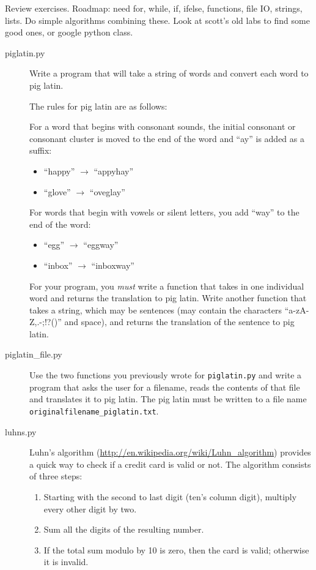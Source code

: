 \documentclass[11pt]{cselabheader}
\begin{document}
Review exercises. Roadmap: need for, while, if, ifelse,
functions, file IO, strings, lists. Do simple algorithms combining these.
Look at scott's old labs to find some good ones, or google python class.

\begin{description}
  \item[piglatin.py] Write a program that will take a string of words and
    convert each word to pig latin. 

    The rules for pig latin are as follows:

    For a word that begins with consonant sounds, the initial consonant or
    consonant cluster is moved to the end of the word and ``ay'' is added as a
    suffix:
    \begin{itemize}
      \item ``happy'' $\to$ ``appyhay''
      \item ``glove'' $\to$ ``oveglay''
    \end{itemize}

    For words that begin with vowels or silent letters, you add ``way'' to the
    end of the word:
    \begin{itemize}
      \item ``egg'' $\to$ ``eggway''
      \item ``inbox'' $\to$ ``inboxway''
    \end{itemize}

    For your program, you \emph{must} write a function that takes in one
    individual word and returns the translation to pig latin. Write another
    function that takes a string, which may be sentences (may contain the
    characters ``a-zA-Z,.-;!?()'' and space), and returns the translation of the
    sentence to pig latin.

  \item[piglatin\_file.py] Use the two functions you previously wrote for
    \texttt{piglatin.py} and write a program that asks the user for a filename,
    reads the contents of that file and translates it to pig latin. The pig
    latin must be written to a file name
    \texttt{originalfilename\_piglatin.txt}.

  \item[luhns.py] Luhn's algorithm
    (\url{http://en.wikipedia.org/wiki/Luhn_algorithm}) provides a quick way to
    check if a credit card is valid or not. The algorithm consists of three
    steps:

    \begin{enumerate}
      \item Starting with the second to last digit (ten's column digit),
        multiply every other digit by two.
      \item Sum all the digits of the resulting number.
      \item If the total sum modulo by 10 is zero, then the card is valid;
        otherwise it is invalid.
    \end{enumerate}


\end{description}
\end{document}
